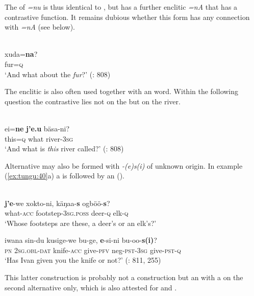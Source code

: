The  of \textit{=nu} is thus identical to , but  has a further enclitic \textit{=nA} that has a contrastive function. It remains dubious whether this form has any connection with  \textit{=nA} (see below).

\ea%
    \label{ex:tungu:38}
    \\
    \gll xuda=\textbf{{na}}?\\
    fur=\textsc{q}\\
    \glt ‘And what about the \textit{fur}?’ (\citealt{NikolaevaTolskaya2001}: 808)
    \z

The enclitic is also often used together with an  word. Within the following question the contrastive  lies not on the  but on the river.

\ea%
    \label{ex:tungu:39}
    \\
    \gll ei=\textbf{{ne}} \textbf{{j’e}}\textbf{.}\textbf{{u}} bäsa-ni?\\
    this=\textsc{q}    what  river-3\textsc{sg}\\
    \glt ‘And what is \textit{this} river called?’ (\citealt{NikolaevaTolskaya2001}: 808)
    \z

\newpage 
Alternative  may also be formed with \textit{-(e)s(i)} of unknown origin. In example (\ref{ex:tungu:40}a) a  is followed by an  ().

\ea%
    \label{ex:tungu:40}
    \\
    \ea
    \gll \textbf{{j’e}}-we    xokto-ni,    käŋaa-\textbf{{s}} ogböö-\textbf{{s}}?\\
    what-\textsc{acc}  footstep-3\textsc{sg}.\textsc{poss}  deer-\textsc{q}    elk-\textsc{q}\\
    \glt ‘Whose footsteps are these, a deer’s or an elk’s?’
    
    \ex
    \gll iwana  sin-du    kusige-we  bu-ge, \textbf{{e}}{-si-ni} bu-oo-\textbf{{s(i)}}?\\
    \textsc{pn}  2\textsc{sg}.\textsc{obl}-\textsc{dat}  knife-\textsc{acc}  give-\textsc{pfv}  neg-\textsc{pst}-3\textsc{sg} give-\textsc{pst}-\textsc{q}\\
    \glt ‘Has Ivan given you the knife or not?’ (\citealt{NikolaevaTolskaya2001}: 811, 255)
    \z
    \z

This latter construction is probably not a  construction but an  with a  on the second alternative only, which is also attested for  and .


